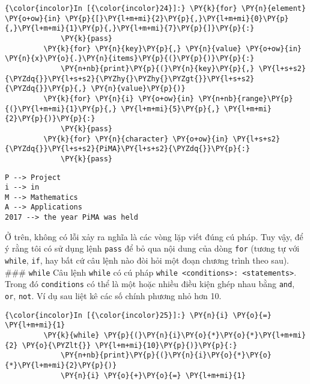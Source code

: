     
\begin{Verbatim}[commandchars=\\\{\}]
{\color{incolor}In [{\color{incolor}24}]:} \PY{k}{for} \PY{n}{element} \PY{o+ow}{in} \PY{p}{[}\PY{l+m+mi}{2}\PY{p}{,}\PY{l+m+mi}{0}\PY{p}{,}\PY{l+m+mi}{1}\PY{p}{,}\PY{l+m+mi}{7}\PY{p}{]}\PY{p}{:}
             \PY{k}{pass}
         \PY{k}{for} \PY{n}{key}\PY{p}{,} \PY{n}{value} \PY{o+ow}{in} \PY{n}{x}\PY{o}{.}\PY{n}{items}\PY{p}{(}\PY{p}{)}\PY{p}{:}
             \PY{n+nb}{print}\PY{p}{(}\PY{n}{key}\PY{p}{,} \PY{l+s+s2}{\PYZdq{}}\PY{l+s+s2}{\PYZhy{}\PYZhy{}\PYZgt{}}\PY{l+s+s2}{\PYZdq{}}\PY{p}{,} \PY{n}{value}\PY{p}{)}
         \PY{k}{for} \PY{n}{i} \PY{o+ow}{in} \PY{n+nb}{range}\PY{p}{(}\PY{l+m+mi}{1}\PY{p}{,} \PY{l+m+mi}{5}\PY{p}{,} \PY{l+m+mi}{2}\PY{p}{)}\PY{p}{:}
             \PY{k}{pass}
         \PY{k}{for} \PY{n}{character} \PY{o+ow}{in} \PY{l+s+s2}{\PYZdq{}}\PY{l+s+s2}{PiMA}\PY{l+s+s2}{\PYZdq{}}\PY{p}{:}
             \PY{k}{pass}
\end{Verbatim}
    

    \begin{Verbatim}[commandchars=\\\{\}]
P --> Project
i --> in
M --> Mathematics
A --> Applications
2017 --> the year PiMA was held

    \end{Verbatim}

    Ở trên, không có lỗi xảy ra nghĩa là các vòng lặp viết đúng cú pháp. Tuy
vậy, để ý rằng tôi có sử dụng lệnh \texttt{pass} để bỏ qua nội dung của
dòng \texttt{for} (tương tự với \texttt{while}, \texttt{if}, hay bất cứ
câu lệnh nào đòi hỏi một đoạn chương trình theo sau). \#\#\#
\texttt{while} Câu lệnh \texttt{while} có cú pháp
\texttt{while\ \textless{}conditions\textgreater{}:\ \textless{}statements\textgreater{}}.
Trong đó \texttt{conditions} có thể là một hoặc nhiều điều kiện ghép
nhau bằng \texttt{and}, \texttt{or}, \texttt{not}. Ví dụ sau liệt kê các
số chính phương nhỏ hơn 10.

    
\begin{Verbatim}[commandchars=\\\{\}]
{\color{incolor}In [{\color{incolor}25}]:} \PY{n}{i} \PY{o}{=} \PY{l+m+mi}{1}
         \PY{k}{while} \PY{p}{(}\PY{n}{i}\PY{o}{*}\PY{o}{*}\PY{l+m+mi}{2} \PY{o}{\PYZlt{}} \PY{l+m+mi}{10}\PY{p}{)}\PY{p}{:}
             \PY{n+nb}{print}\PY{p}{(}\PY{n}{i}\PY{o}{*}\PY{o}{*}\PY{l+m+mi}{2}\PY{p}{)}
             \PY{n}{i} \PY{o}{+}\PY{o}{=} \PY{l+m+mi}{1}
\end{Verbatim}
    

